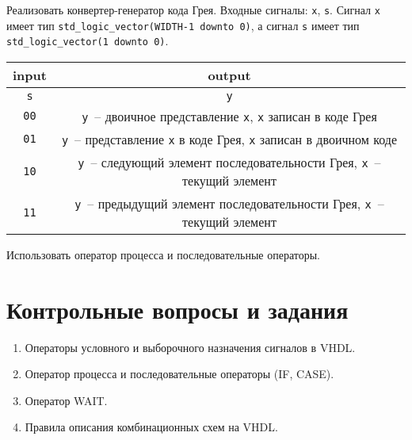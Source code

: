 Реализовать конвертер-генератор кода Грея. Входные сигналы: \lstinline?x?, \lstinline?s?. Сигнал \lstinline?x? имеет тип \lstinline?std_logic_vector(WIDTH-1 downto 0)?, а сигнал \lstinline?s? имеет тип \lstinline?std_logic_vector(1 downto 0)?.

\begin{table}[h]
\centering
\begin{tabular}{|c|c|}
\hline
input         & output                                                                                          \\ \hline
\lstinline?s? & \lstinline?y?                                                                                   \\ \hline
\texttt{00}   & \lstinline?y?~-- двоичное представление \lstinline?x?, \lstinline?x? записан в коде Грея        \\
\texttt{01}   & \lstinline?y?~-- представление \lstinline?x? в коде Грея, \lstinline?x? записан в двоичном коде \\
\texttt{10}   & \lstinline?y?~-- следующий элемент последовательности Грея, \lstinline?x?~-- текущий элемент    \\
\texttt{11}   & \lstinline?y?~-- предыдущий элемент последовательности Грея, \lstinline?x?~-- текущий элемент   \\
\hline
\end{tabular}
\end{table}

Использовать оператор процесса и последовательные операторы.

\section{Контрольные вопросы и задания}

\begin{enumerate}
\item Операторы условного и выборочного назначения сигналов в VHDL.
\item Оператор процесса и последовательные операторы (IF, CASE).
\item Оператор WAIT.
\item Правила описания комбинационных схем на VHDL.
\end{enumerate}

